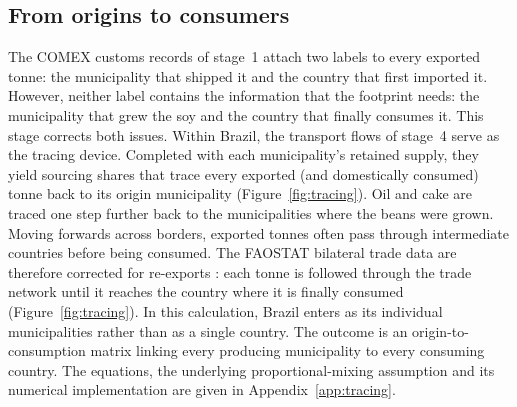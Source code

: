 \documentclass[pdflatex,sn-nature]{sn-jnl}%
\begin{document}
\subsection{From origins to consumers}\label{subsec:origin2consumer}
The COMEX customs records of stage~1 attach two labels to every exported
tonne: the municipality that shipped it and the country that first
imported it. However, neither label contains the information that the
footprint needs: the municipality that grew the soy and the country that
finally consumes it. This stage corrects both issues. Within Brazil, the
transport flows of stage~4 serve as the tracing device. Completed with
each municipality's retained supply, they yield sourcing shares that trace
every exported (and domestically consumed) tonne back to its origin
municipality (Figure~\ref{fig:tracing}). Oil and cake are traced one step
further back to the municipalities where the beans were grown. Moving
forwards across borders, exported tonnes often pass through intermediate
countries before being consumed. The FAOSTAT bilateral trade data are
therefore corrected for re-exports \cite{kastner2011tracing}: each tonne
is followed through the trade network until it reaches the country where
it is finally consumed (Figure~\ref{fig:tracing}). In this calculation,
Brazil enters as its individual municipalities rather than as a single
country. The outcome is an origin-to-consumption matrix linking every
producing municipality to every consuming country. The equations, the
underlying proportional-mixing assumption and its numerical implementation
are given in Appendix~\ref{app:tracing}.
\end{document}
